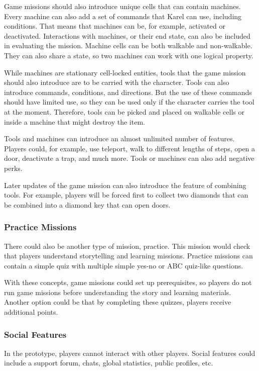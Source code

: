 Game missions should also introduce unique cells that can contain machines.
Every machine can also add a set of commands that Karel can use, including conditions.
That means that machines can be, for example, activated or deactivated.
Interactions with machines, or their end state, can also be included in evaluating the mission.
Machine cells can be both walkable and non-walkable.
They can also share a state, so two machines can work with one logical property.

While machines are stationary cell-locked entities, tools that the game mission should also introduce are to be carried with the character.
Tools can also introduce commands, conditions, and directions.
But the use of these commands should have limited use, so they can be used only if the character carries the tool at the moment.  
Therefore, tools can be picked and placed on walkable cells or inside a machine that might destroy the item.

Tools and machines can introduce an almost unlimited number of features.
Players could, for example, use teleport, walk to different lengths of steps, open a door, deactivate a trap, and much more.
Tools or machines can also add negative perks.

Later updates of the game mission can also introduce the feature of combining tools.
For example, players will be forced first to collect two diamonds that can be combined into a diamond key that can open doors.

\subsubsection{Practice Missions}

There could also be another type of mission, practice.
This mission would check that players understand storytelling and learning missions.
Practice missions can contain a simple quiz with multiple simple yes-no or ABC quiz-like questions.

With these concepts, game missions could set up prerequisites, so players do not run game missions before understanding the story and learning materials.
Another option could be that by completing these quizzes, players receive additional points.

\subsubsection{Social Features}

In the prototype, players cannot interact with other players.
Social features could include a support forum, chats, global statistics, public profiles, etc.

